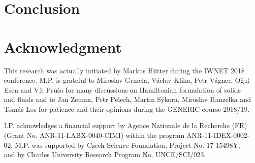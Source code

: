 \documentclass[
10pt, %
a4paper, %
oneside, %
headinclude,footinclude, %
BCOR5mm, %
]{scrartcl}
\begin{document}
\section{Conclusion}

\section*{Acknowledgment}
This research was actually initiated by Markus H{\" u}tter during the IWNET 2018 conference. M.P. is grateful to Miroslav Grmela, Václav Klika, Petr Vágner, O{\u g}ul Esen and V{\' i}t Pr{\r u}{\v s}a for many discussions on Hamiltonian formulation of solids and fluids and to Jan Zeman, Petr Pelech, Martin Sýkora, Miroslav Hanzelka and Tomáš Los for patience and their opinions during the GENERIC course 2018/19.

I.P. acknowledges a financial support by Agence Nationale de la Recherche (FR) (Grant No. ANR-11-LABX-0040-CIMI) within the program ANR-11-IDEX-0002-02. M.P. was supported by Czech Science Foundation, Project No. 17-15498Y, and by Charles University Research Program No. UNCE/SCI/023. 


\renewcommand{\refname}{\spacedlowsmallcaps{References}} %





\appendix
\end{document}
